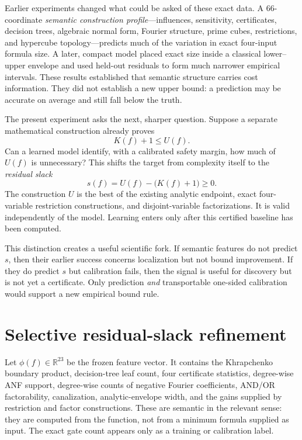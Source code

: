 \documentclass[11pt]{article}
\begin{document}
Earlier experiments changed what could be asked of these exact data.  A
66-coordinate \emph{semantic construction profile}---influences, sensitivity,
certificates, decision trees, algebraic normal form, Fourier structure, prime
cubes, restrictions, and hypercube topology---predicts much of the variation
in exact four-input formula size.  A later, compact model placed exact size
inside a classical lower--upper envelope and used held-out residuals to form
much narrower empirical intervals.  These results established that semantic
structure carries cost information.  They did not establish a new upper
bound: a prediction may be accurate on average and still fall below the truth.

The present experiment asks the next, sharper question.  Suppose a separate
mathematical construction already proves
\begin{equation}
 K(f)+1\le U(f).
 \label{eq:construction}
\end{equation}
Can a learned model identify, with a calibrated safety margin, how much of
$U(f)$ is unnecessary?  This shifts the target from complexity itself to the
\emph{residual slack}
\begin{equation}
 s(f)=U(f)-\bigl(K(f)+1\bigr)\ge0.
 \label{eq:slack}
\end{equation}
The construction $U$ is the best of the existing analytic endpoint, exact
four-variable restriction constructions, and disjoint-variable
factorizations.  It is valid independently of the model.  Learning enters
only after this certified baseline has been computed.

This distinction creates a useful scientific fork.  If semantic features do
not predict $s$, then their earlier success concerns localization but not
bound improvement.  If they do predict $s$ but calibration fails, then the
signal is useful for discovery but is not yet a certificate.  Only prediction
\emph{and} transportable one-sided calibration would support a new empirical
bound rule.

\section{Selective residual-slack refinement}

Let $\phi(f)\in\mathbb R^{23}$ be the frozen feature vector.  It contains the
Khrapchenko boundary product, decision-tree leaf count, four certificate
statistics, degree-wise ANF support, degree-wise counts of negative Fourier
coefficients, AND/OR factorability, canalization, analytic-envelope width,
and the gains supplied by restriction and factor constructions.  These are
semantic in the relevant sense: they are computed from the function, not
from a minimum formula supplied as input.  The exact gate count appears only
as a training or calibration label.
\end{document}
